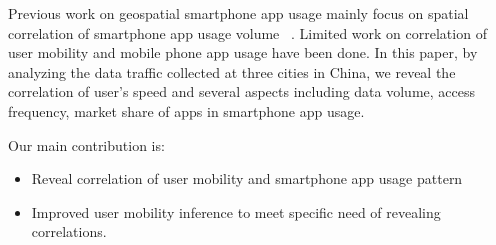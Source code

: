Previous work on geospatial smartphone app usage mainly focus on spatial correlation of smartphone app usage volume ~\cite{shafiq2012characterizing, yang2015characterizing}. Limited work on correlation of user mobility and mobile phone app usage have been done. In this paper, by analyzing the data traffic collected at three cities in China, we reveal the correlation of user's speed and several aspects including data volume, access frequency, market share of apps in smartphone app usage. 

Our main contribution is:
\begin{itemize}
	\item Reveal correlation of user mobility and smartphone app usage pattern
	\item Improved user mobility inference to meet specific need of revealing correlations.
\end{itemize}

